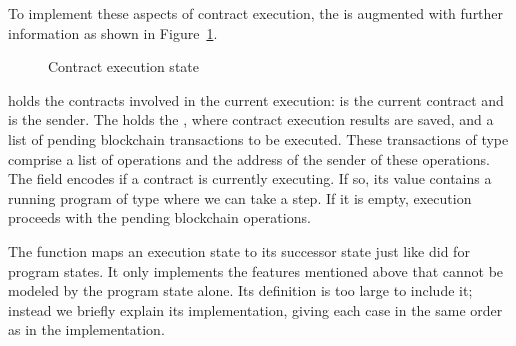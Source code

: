 \begin{comment}
When a contract execution terminates, the final stack interpretation will contain a pair
of a list of blockchain operations to be emitted by the contract as well as the updated
storage value of the contract.
Also contract execution is triggered by transfering some amount of Tezos tokens to it,
so it's balance and storage has to be updated and the emitted operations
must be staged for execution.
\end{comment}


To implement these aspects of contract execution, the 
is augmented with further information as shown in Figure~\ref{fig:contract-execution-state}.
\begin{figure}[tp]
  \ConcretePrgRunning
  \ConcreteTransaction
  \ConcreteExecState
  \caption{Contract execution state}
  \label{fig:contract-execution-state}
\end{figure}
 holds the contracts involved in the current
execution:  is the current contract and  is
the sender.
The  holds the , where contract execution results are saved,
and a list of pending blockchain transactions to be executed. These
transactions of type  comprise a list of operations and the address of the
sender of these operations.
The field  encodes if a contract is currently executing.
If so, its value contains a running program of type 
where we can take a step. If it is empty, execution
proceeds with the pending blockchain operations.

The function {\ConcreteExecStep} maps an execution state to its successor state
just like  did for program states.
It only implements the features mentioned above that cannot be modeled
by the program state alone.
Its definition is too large to include it; instead
we briefly explain its implementation, giving each case in the same
order as in the implementation.

